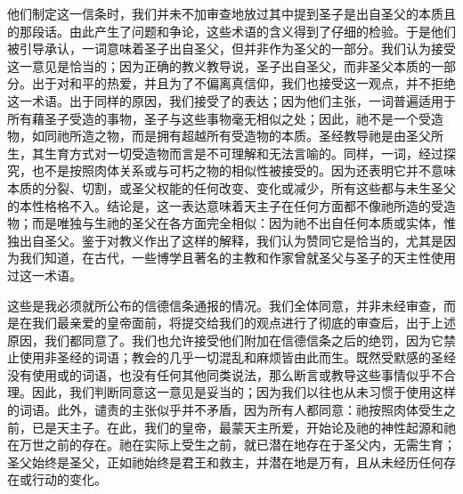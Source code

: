 \par

\par

他们制定这一信条时，我们并未不加审查地放过其中提到圣子是出自圣父的本质且的那段话。由此产生了问题和争论，这些术语的含义得到了仔细的检验。于是他们被引导承认，一词意味着圣子出自圣父，但并非作为圣父的一部分。我们认为接受这一意见是恰当的；因为正确的教义教导说，圣子出自圣父，而非圣父本质的一部分。出于对和平的热爱，并且为了不偏离真信仰，我们也接受这一观点，并不拒绝这一术语。出于同样的原因，我们接受了的表达；因为他们主张，一词普遍适用于所有藉圣子受造的事物，圣子与这些事物毫无相似之处；因此，祂不是一个受造物，如同祂所造之物，而是拥有超越所有受造物的本质。圣经教导祂是由圣父所生，其生育方式对一切受造物而言是不可理解和无法言喻的。同样，一词，经过探究，也不是按照肉体关系或与可朽之物的相似性被接受的。因为还表明它并不意味本质的分裂、切割，或圣父权能的任何改变、变化或减少，所有这些都与未生圣父的本性格格不入。结论是，这一表达意味着天主子在任何方面都不像祂所造的受造物；而是唯独与生祂的圣父在各方面完全相似：因为祂不出自任何本质或实体，惟独出自圣父。鉴于对教义作出了这样的解释，我们认为赞同它是恰当的，尤其是因为我们知道，在古代，一些博学且著名的主教和作家曾就圣父与圣子的天主性使用过这一术语。\par

这些是我必须就所公布的信德信条通报的情况。我们全体同意，并非未经审查，而是在我们最亲爱的皇帝面前，将提交给我们的观点进行了彻底的审查后，出于上述原因，我们都同意了。我们也允许接受他们附加在信德信条之后的绝罚，因为它禁止使用非圣经的词语；教会的几乎一切混乱和麻烦皆由此而生。既然受默感的圣经没有使用或的词语，也没有任何其他同类说法，那么断言或教导这些事情似乎不合理。因此，我们判断同意这一意见是妥当的；因为我们以往也从未习惯于使用这样的词语。此外，谴责的主张似乎并不矛盾，因为所有人都同意：祂按照肉体受生之前，已是天主子。在此，我们的皇帝，最蒙天主所爱，开始论及祂的神性起源和祂在万世之前的存在。祂在实际上受生之前，就已潜在地存在于圣父内，无需生育；圣父始终是圣父，正如祂始终是君王和救主，并潜在地是万有，且从未经历任何存在或行动的变化。\par

